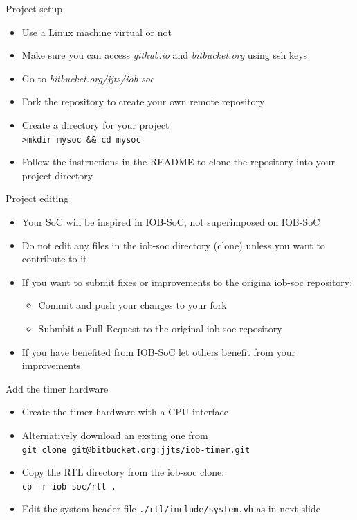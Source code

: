 \documentclass [xcolor=svgnames, t] {beamer}
\begin{document}
\begin{frame}{Project setup}
\begin{center}
  \begin{itemize}
    \item Use a Linux machine virtual or not
    \item Make sure you can access {\it github.io} and {\it bitbucket.org} using ssh keys
    \item Go to {\it bitbucket.org/jjts/iob-soc}
    \item Fork the repository to create your own remote repository
    \item Create a directory for your project\\
      {\tt >mkdir mysoc \&\& cd mysoc}
    \item Follow the instructions in the README to clone the repository into your project directory
  \end{itemize}
\end{center}
\end{frame}


\begin{frame}{Project editing}
\begin{itemize}
\item Your SoC will be inspired in IOB-SoC, not superimposed on IOB-SoC
\item Do not edit any files in the iob-soc directory (clone) unless you want to contribute to it
\item If you want to submit fixes or improvements to the origina iob-soc repository:
  \begin{itemize}
  \item Commit and push your changes to your fork
  \item Submbit a Pull Request to the original iob-soc repository
  \end{itemize}
\item If you have benefited from IOB-SoC let others benefit from your improvements
\end{itemize}
\end{frame}

\begin{frame}{Add the timer hardware}
\begin{itemize}
\item Create the timer hardware with a CPU interface
\item Alternatively download an exsting one from
  \\{\tt git clone git@bitbucket.org:jjts/iob-timer.git}
\item Copy the RTL directory from the iob-soc clone:
  \\{\tt cp -r iob-soc/rtl .}
\item Edit the system header file {\tt ./rtl/include/system.vh} as in next slide\\
\end{itemize}
\end{frame}
\end{document}
